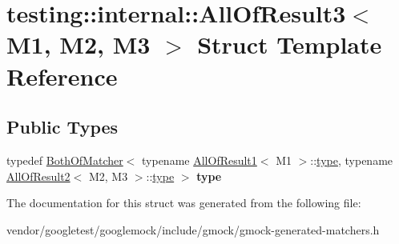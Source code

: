 \hypertarget{structtesting_1_1internal_1_1_all_of_result3}{}\section{testing\+:\+:internal\+:\+:All\+Of\+Result3$<$ M1, M2, M3 $>$ Struct Template Reference}
\label{structtesting_1_1internal_1_1_all_of_result3}
\subsection*{Public Types}
\begin{DoxyCompactItemize}
\item 
\mbox{\label{structtesting_1_1internal_1_1_all_of_result3_a18073a23acd542bccf3a6c5d7f72f957}} 
typedef \hyperlink{classtesting_1_1internal_1_1_both_of_matcher}{Both\+Of\+Matcher}$<$ typename \hyperlink{structtesting_1_1internal_1_1_all_of_result1}{All\+Of\+Result1}$<$ M1 $>$\+::\hyperlink{classtesting_1_1internal_1_1_both_of_matcher}{type}, typename \hyperlink{structtesting_1_1internal_1_1_all_of_result2}{All\+Of\+Result2}$<$ M2, M3 $>$\+::\hyperlink{classtesting_1_1internal_1_1_both_of_matcher}{type} $>$ {\bfseries type}
\end{DoxyCompactItemize}


The documentation for this struct was generated from the following file\+:\begin{DoxyCompactItemize}
\item 
vendor/googletest/googlemock/include/gmock/gmock-\/generated-\/matchers.\+h\end{DoxyCompactItemize}
